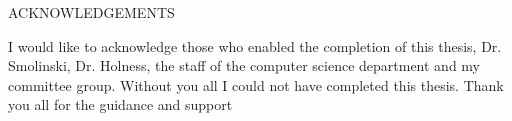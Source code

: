 \begin{center}

\begin{bfseries}

ACKNOWLEDGEMENTS\\

\end{bfseries}

\end{center}


\begin{flushleft}
\doublespacing
I would like to acknowledge those who enabled the completion of this thesis,
Dr. Smolinski, Dr. Holness, the staff of the computer science department
and my committee group. Without you all I could not have completed this thesis.
Thank you all for the guidance and support\\
\singlespacing
\end{flushleft}


\pagebreak
